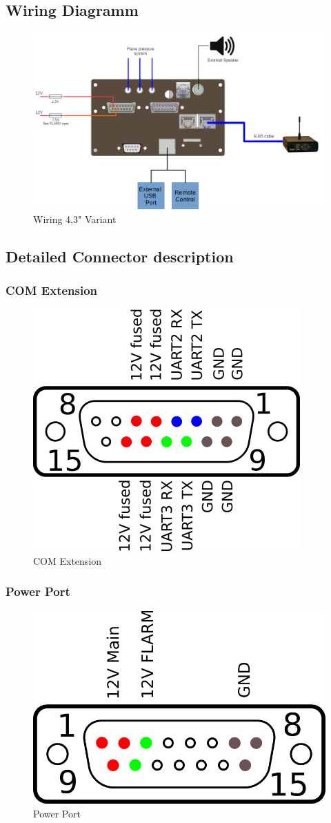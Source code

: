 \subsection{Wiring Diagramm}
\begin{figure}[H]
	\hspace*{-2cm}
	\includegraphics[angle=90, origin=c, width=1.1\linewidth]{figures/43_variant/wiring}
	\caption{Wiring 4,3" Variant}
	\label{fig:wiring}
\end{figure}
\newpage

\subsection{Detailed Connector description}

\subsubsection{COM Extension}
\begin{figure}[ht]
	\includegraphics[width=0.6\linewidth]{figures/43_variant/COM_extension}
	\caption{COM Extension}
	\label{fig:com_extension}
\end{figure}

\subsubsection{Power Port}
\begin{figure}[ht]
	\includegraphics[width=0.6\linewidth]{figures/43_variant/power_port}
	\caption{Power Port}
	\label{fig:power_port}
\end{figure}
